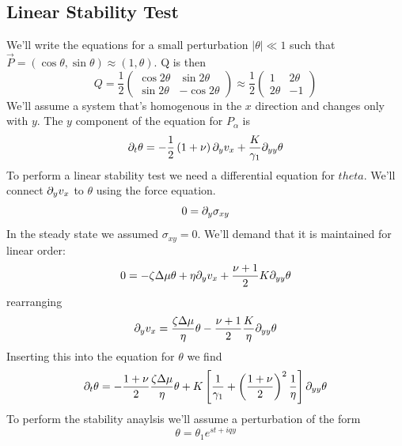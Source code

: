 \subsection{Linear Stability Test}
We'll write the equations for a small perturbation \(\lvert\theta\rvert \ll 1\) such that \(\vec{P} = (\cos\theta, \sin\theta) \approx (1, \theta)\). Q is then
\begin{equation}
    Q = \frac{1}{2}\begin{pmatrix}
        \cos2\theta & \sin2\theta \\
        \sin2\theta & -\cos2\theta
    \end{pmatrix} \approx \frac{1}{2}\begin{pmatrix}
        1 & 2\theta \\
        2\theta & -1
    \end{pmatrix}
\end{equation}
We'll assume a system that's homogenous in the \(x\) direction and changes only with \(y\). The \(y\) component of the equation for \(P_\alpha \) is
\begin{equation}
    \partial_t\theta = -\frac{1}{2}\left(1+\nu\right)\partial_y v_x + \frac{K}{\gamma_1}\partial_{yy}\theta
\end{equation}
To perform a linear stability test we need a differential equation for \(theta\). We'll connect \(\partial_y v_x\) to \(\theta\) using the force equation.
\begin{equation}
    0 = \partial_y\sigma_{xy}
\end{equation}
In the steady state we assumed \(\sigma_{xy}=0\). We'll demand that it is maintained for linear order:
\begin{equation}
    0=-\zeta\Delta\mu \theta + \eta \partial_y v_x + \frac{\nu+1}{2} K\partial_{yy}\theta
\end{equation}
rearranging
\begin{equation}
    \partial_y v_x = \frac{\zeta\Delta\mu}{\eta}\theta - \frac{\nu+1}{2}\frac{K}{\eta}\partial_{yy}\theta
\end{equation}
Inserting this into the equation for \(\theta \) we find
\begin{equation}
    \partial_t\theta = -\frac{1+\nu}{2}\frac{\zeta\Delta\mu}{\eta}\theta + K\left[\frac{1}{\gamma_1} + \left(\frac{1+\nu}{2}\right)^2\frac{1}{\eta}\right]\partial_{yy}\theta
\end{equation}
To perform the stability anaylsis we'll assume a perturbation of the form
\begin{equation}
    \theta = \theta_1 e^{st+iqy}
\end{equation}
